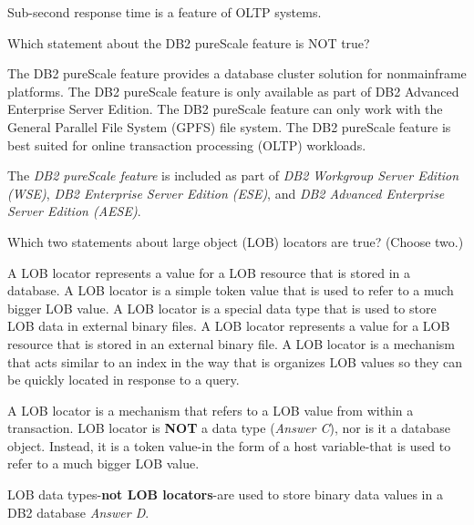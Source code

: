 \documentclass[answers, 11pt]{exam}
\begin{document}
\begin{questions}
\begin{solution}
Sub-second response time is a feature of OLTP systems.
\end{solution}

\question[1]
Which statement about the DB2 pureScale feature is NOT true?
\begin{choices}
\choice The DB2 pureScale feature provides a database cluster solution for nonmainframe platforms.
\CorrectChoice The DB2 pureScale feature is only available as part of DB2 Advanced Enterprise Server Edition.
\choice The DB2 pureScale feature can only work with the General Parallel File System (GPFS) file system.
\choice The DB2 pureScale feature is best suited for online transaction processing (OLTP) workloads.
\end{choices}

\begin{solution}
The \textit{DB2 pureScale feature} is included as part of \textit{DB2 Workgroup
Server Edition (WSE)}, \textit{DB2 Enterprise Server Edition (ESE)}, and 
\textit{DB2 Advanced Enterprise Server Edition (AESE)}.
\end{solution}

\newpage
\addpoints

\question[1]
Which two statements about large object (LOB) locators are true? (Choose two.)
\begin{choices}
\CorrectChoice A LOB locator represents a value for a LOB resource that is stored in a database.
\CorrectChoice A LOB locator is a simple token value that is used to refer to a much bigger LOB value.
\choice A LOB locator is a special data type that is used to store LOB data in external binary files.
\choice A LOB locator represents a value for a LOB resource that is stored in an external binary file.
\choice A LOB locator is a mechanism that acts similar to an index in the way that is organizes LOB values
		so they can be quickly located in response to a query.
\end{choices}

\begin{solution}
A LOB locator is a mechanism that refers to a LOB value from within a transaction.
LOB locator is \textbf{NOT} a data type (\textit{Answer C}), nor is it a database
object. Instead, it is a token value-in the form of a host variable-that is used to
refer to a much bigger LOB value.
\par

LOB data types-\textbf{not LOB locators}-are used to store binary data values in a DB2 database
\textit{Answer D}.
\par


\end{solution}
\end{questions}
\end{document}
